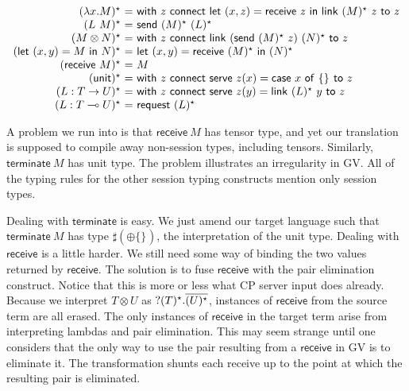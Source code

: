 \documentclass{easychair}
\makeatletter
\newcommand{\ba}{\begin{array}}
\newcommand{\ea}{\end{array}}
\newenvironment{equations}{\[\ba{@{}r@{~}c@{~}l@{}}}{\ea\]}
\newcommand{\key}{\mathsf}
\newcommand{\set}[1]{\{ #1 \}}
\newcommand{\row}[2]{\set{#1}_{#2}}
\newcommand{\gvInput}[2]{\mathord{?}{#1}.{#2}}
\newcommand{\gvPlus}[2]{\oplus \row{#1}{#2}}
\newcommand{\gvService}[1]{\sharp {#1}}
\newcommand{\gvDual}[1]{\overline{#1}}
\newcommand{\lolli}{\multimap}
\newcommand{\gvLinFun}[2]{{#1} \lolli {#2}}
\newcommand{\gvUnFun}[2]{{#1} \to {#2}}
\newcommand{\gvTimes}[2]{{#1} \otimes {#2}}
\newcommand{\gvUnit}{\key{unit}}
\newcommand{\gvLink}[2]{\key{link}~{#1}~{#2}}
\newcommand{\gvLam}[2]{\lambda {#1}.{#2}}
\newcommand{\gvApp}[2]{{#1}~{#2}}
\newcommand{\gvPair}[2]{({#1},{#2})}
\newcommand{\gvLet}[3]{\key{let}~{#1}={#2}~\key{in}~{#3}}
\newcommand{\gvSend}[2]{\key{send}~{#1}~{#2}}
\newcommand{\gvReceive}[1]{\key{receive}~{#1}}
\newcommand{\gvCase}[2]{\key{case}~{#1}~\key{of}~{#2}}
\newcommand{\gvWith}[3]{\key{with}~{#1}~\key{connect}~{#2}~\key{to}~{#3}}
\newcommand{\gvTerminate}[1]{\key{terminate}~{#1}}
\newcommand{\gvServe}[3]{\key{serve}~{#1}({#2})={#3}}
\newcommand{\gvRequest}[1]{\key{request}~{#1}}
\makeatother
\begin{document}
\begin{equations}
\gvtogv{\gvLam{x}{M}} &=& \gvWith{z}{\gvLet{\gvPair{x}{z}}{\gvReceive{z}}{\gvLink{\gvtogv{M}}{z}}}{z} \\
\gvtogv{\gvApp{L}{M}} &=& \gvSend{\gvtogv{M}}{\gvtogv{L}} \\
\gvtogv{\gvTimes{M}{N}} &=&
  \gvWith{z}
    {\gvLink{(\gvSend{\gvtogv{M}}{z})}{\gvtogv{N}}}
    {z} \\
\gvtogv{\gvLet{\gvPair{x}{y}}{M}{N}} &=&
    \gvLet{\gvPair{x}{y}}{\gvReceive{\gvtogv{M}}}{\gvtogv{N}} \\
\gvtogv{\gvReceive{M}} &=& M \\
\gvtogv{\gvUnit} &=&
    \gvWith{z}
    {\gvServe{z}{x}{\gvCase{x}{\row{}{}}}}
    {z} \\
\gvtogv{L : \gvUnFun{T}{U}} &=&
  \gvWith{z}{\gvServe{z}{y}{\gvLink{\gvtogv{L}}{y}}}{z} \\
\gvtogv{L : \gvLinFun{T}{U}} &=& \gvRequest{\gvtogv{L}} \\
\end{equations}

A problem we run into is that $\gvReceive{M}$ has tensor type, and yet
our translation is supposed to compile away non-session types,
including tensors. Similarly, $\gvTerminate{M}$ has unit type. The
problem illustrates an irregularity in GV. All of the typing rules for
the other session typing constructs mention only session types.

Dealing with $\key{terminate}$ is easy. We just amend our target
language such that $\gvTerminate{M}$ has type
$\gvService{(\gvPlus{}{})}$, the interpretation of the unit type.
%
Dealing with $\key{receive}$ is a little harder. We still need some
way of binding the two values returned by $\key{receive}$. The
solution is to fuse $\key{receive}$ with the pair elimination
construct. Notice that this is more or less what CP server input does
already. Because we interpret $\gvTimes{T}{U}$ as
$\gvInput{\gvtogv{T}}{\gvDual{\gvtogv{U}}}$, instances of
$\key{receive}$ from the source term are all erased. The only
instances of $\key{receive}$ in the target term arise from
interpreting lambdas and pair elimination. This may seem strange until
one considers that the only way to use the pair resulting from a
$\key{receive}$ in GV is to eliminate it. The transformation shunts
each receive up to the point at which the resulting pair is
eliminated.
\end{document}
